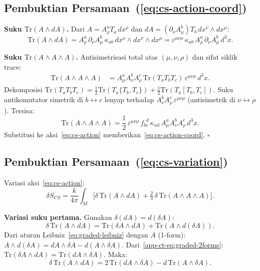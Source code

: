  
\subsection{Pembuktian Persamaan~(\ref{eq:cs-action-coord})}
\label{app:proof-cs-coord}
 
\noindent\textbf{Suku $\mathrm{Tr}(A \wedge dA)$.} Dari $A = A^a_\rho T_a\,dx^\rho$ dan $dA = (\partial_\nu A^b_\mu)T_b\,dx^\nu \wedge dx^\mu$:
\begin{equation}
    \mathrm{Tr}(A \wedge dA) = A^a_\rho\,\partial_\nu A^b_\mu\,\kappa_{ab}\,dx^\rho \wedge dx^\nu \wedge dx^\mu = \varepsilon^{\mu\nu\rho}\,\kappa_{ab}\,A^a_\rho\,\partial_\nu A^b_\mu\,d^3x.
\end{equation}
 
\noindent\textbf{Suku $\mathrm{Tr}(A \wedge A \wedge A)$.} Antisimetrisasi total atas $(\mu,\nu,\rho)$ dan sifat siklik trace:
\begin{align}
    \mathrm{Tr}(A \wedge A \wedge A)
    &= A^a_\mu A^b_\nu A^c_\rho\,\mathrm{Tr}(T_a T_b T_c)\,\varepsilon^{\mu\nu\rho}\,d^3x.
\end{align}
Dekomposisi $\mathrm{Tr}(T_a T_b T_c) = \frac{1}{2}\mathrm{Tr}(T_a\{T_b,T_c\}) + \frac{1}{2}\mathrm{Tr}(T_a[T_b,T_c])$. Suku antikomutator simetrik di $b \leftrightarrow c$ lenyap terhadap $A^b_\nu A^c_\rho\,\varepsilon^{\mu\nu\rho}$ (antisimetrik di $\nu \leftrightarrow \rho$). Tersisa:
\begin{equation}
    \mathrm{Tr}(A \wedge A \wedge A) = \frac{1}{2}\,\varepsilon^{\mu\nu\rho}\,f_{bc}^{\ \ d}\,\kappa_{ad}\,A^a_\mu A^b_\nu A^c_\rho\,d^3x.
\end{equation}
Substitusi ke aksi~\eqref{eq:cs-action} memberikan~\eqref{eq:cs-action-coord}. $\square$
 
 
\subsection{Pembuktian Persamaan~(\ref{eq:cs-variation})}
\label{app:proof-cs-variation}
 
Variasi aksi~\eqref{eq:cs-action}:
\begin{equation}
    \delta S_{CS} = \frac{k}{4\pi}\int_M \big[\delta\,\mathrm{Tr}(A \wedge dA) + \tfrac{2}{3}\,\delta\,\mathrm{Tr}(A \wedge A \wedge A)\big].
\end{equation}
 
\noindent\textbf{Variasi suku pertama.} Gunakan $\delta(dA) = d(\delta A)$:
\begin{equation}
    \delta\,\mathrm{Tr}(A \wedge dA) = \mathrm{Tr}(\delta A \wedge dA) + \mathrm{Tr}(A \wedge d(\delta A)).
\end{equation}
Dari aturan Leibniz~\eqref{eq:graded-leibniz} dengan $A$ (1-form): $A \wedge d(\delta A) = dA \wedge \delta A - d(A \wedge \delta A)$. Dari~\eqref{app-ct-eq:graded-2forms}: $\mathrm{Tr}(\delta A \wedge dA) = \mathrm{Tr}(dA \wedge \delta A)$. Maka:
\begin{equation}\label{app-cs-eq:var-AdA}
    \delta\,\mathrm{Tr}(A \wedge dA) = 2\,\mathrm{Tr}(dA \wedge \delta A) - d\,\mathrm{Tr}(A \wedge \delta A).
\end{equation}
 
